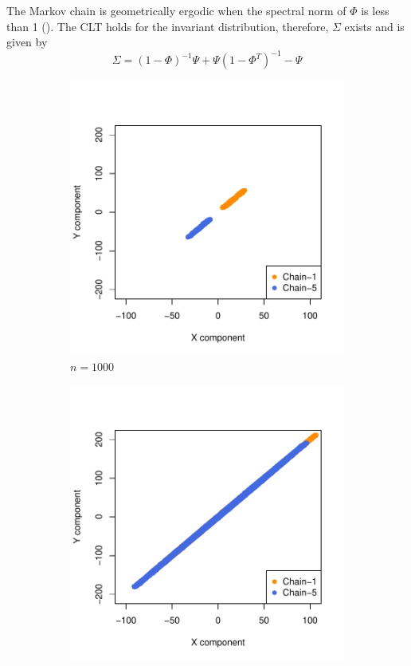 \documentclass[11pt]{article}
\theoremstyle{remark}
\begin{document}
The Markov chain is geometrically ergodic when the spectral norm of $\Phi$ is less than 1 (\cite{10.2307/1427459}). The CLT holds for the invariant distribution, therefore, $\Sigma$ exists and is given by
%
\[
\Sigma = (1 - \Phi)^{-1}\Psi + \Psi(1 - \Phi^T)^{-1} - \Psi
\]


 \begin{figure}[h]
     \centering
     \begin{subfigure}[h]{0.4\textwidth}
          \centering
          \includegraphics[width=\textwidth]{plots/var-sp_n1e3.pdf}
          \caption{$n = 1000$}
          \label{subfig:var-sp_1000}
      \end{subfigure}
      \begin{subfigure}[h]{0.4\textwidth}
          \centering
          \includegraphics[width=\textwidth]{plots/var-sp_n1e4.pdf}

\end{subfigure}
\end{figure}
\end{document}

